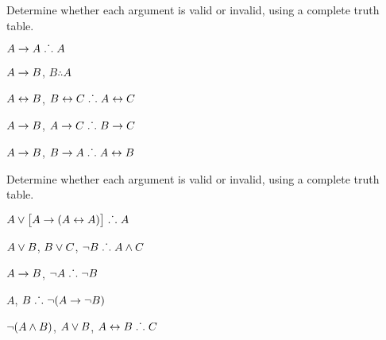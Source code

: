 \noindent\problempart
\label{pr.TT.valid}
Determine whether each argument is valid or invalid, using a complete truth table. 
\begin{earg}
\item $A\rightarrow A \mathrel{\ldotp\dot{}\,\ldotp}  A$ \vspace{.5ex}%

\item $A\rightarrow B$, $B \therefore  A$ %

\item $A\leftrightarrow B$, $B\leftrightarrow C \mathrel{\ldotp\dot{}\,\ldotp} A\leftrightarrow C$ %

\item $A \rightarrow B$, $A \rightarrow C\mathrel{\ldotp\dot{}\,\ldotp} B \rightarrow C$ %

\item $A \rightarrow B$, $B \rightarrow A\mathrel{\ldotp\dot{}\,\ldotp} A \leftrightarrow B$ %

\end{earg}

\noindent\problempart
\label{pr.TT.valid}
Determine whether each argument is valid or invalid, using a complete truth table. 
\begin{earg}
\item $A\vee\bigl[A\rightarrow(A\leftrightarrow A)\bigr] \mathrel{\ldotp\dot{}\,\ldotp}  A $\vspace{.5ex}%
\item $A\vee B$, $B\vee C$, $\neg B \mathrel{\ldotp\dot{}\,\ldotp} A \wedge C$\vspace{.5ex} %
\item $A \rightarrow B$, $\neg A\mathrel{\ldotp\dot{}\,\ldotp} \neg B$ \vspace{.5ex}%
\item $A$, $B\mathrel{\ldotp\dot{}\,\ldotp} \neg(A\rightarrow \neg B)$ \vspace{.5ex}%
\item $\neg(A \wedge B)$, $A \vee B$, $A \leftrightarrow B\mathrel{\ldotp\dot{}\,\ldotp} C$ \vspace{.5ex}%
\end{earg}

